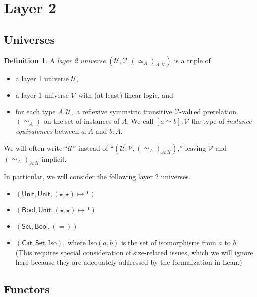\documentclass[a4paper]{article}
\theoremstyle{definition}
\newtheorem{definition}{Definition}[section]
\theoremstyle{remark}
\newcommand{\defn}{\emph}
\renewcommand{\equiv}{\simeq}
\newcommand{\U}{\mathcal{U}}
\newcommand{\V}{\mathcal{V}}
\newcommand{\nm}{\mathsf}
\newcommand{\universe}{\nm}
\newcommand{\Unit}{\universe{Unit}}
\newcommand{\Bool}{\universe{Bool}}
\newcommand{\Set}{\universe{Set}}
\newcommand{\Cat}{\universe{Cat}}
\newcommand{\Iso}{\mathrm{Iso}}
\begin{document}
\section{Layer 2}

\subsection{Universes}

\begin{definition}
  A \defn{layer 2 universe} $(\U,\V,(\equiv_A)_{A : \U})$ is a triple of
  \begin{itemize}
    \item a layer 1 universe $\U,$
    \item a layer 1 universe $\V$ with (at least) linear logic, and
    \item for each type $A : \U,$ a reflexive symmetric transitive $\V$-valued prerelation
    $(\equiv_A)$ on the set of instances of $A.$ We call $[a \equiv b] : \V$ the type of
    \defn{instance equivalences} between $a : A$ and $b : A.$
  \end{itemize}

  We will often write ``$\U$'' instead of ``$(\U,\V,(\equiv_A)_{A : \U})$,'' leaving $\V$ and
  $(\equiv_A)_{A : \U}$ implicit.
\end{definition}

In particular, we will consider the following layer 2 universes.
\begin{itemize}
  \item $(\Unit, \Unit, (\star,\star) \mapsto \ast)$
  \item $(\Bool, \Unit, (\star,\star) \mapsto \ast)$
  \item $(\Set, \Bool, (=))$
  \item $(\Cat, \Set, \Iso),$ where $\Iso(a,b)$ is the set of isomorphisms from $a$ to $b.$
  (This requires special consideration of size-related issues, which we will ignore here because
  they are adequately addressed by the formalization in Lean.)
\end{itemize}

\subsection{Functors}
\end{document}
